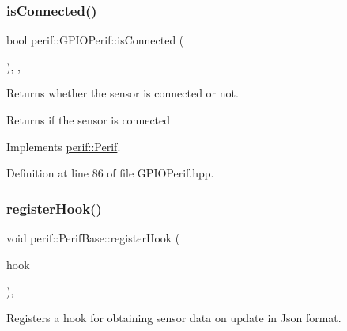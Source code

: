 \subsubsection{\texorpdfstring{isConnected()}{isConnected()}}
{\footnotesize\ttfamily bool perif\+::\+G\+P\+I\+O\+Perif\+::is\+Connected (\begin{DoxyParamCaption}{ }\end{DoxyParamCaption})\hspace{0.3cm}{\ttfamily [inline]}, {\ttfamily [override]}, {\ttfamily [virtual]}}

Returns whether the sensor is connected or not.

\begin{DoxyReturn}{Returns}
if the sensor is connected 
\end{DoxyReturn}


Implements \mbox{\hyperlink{classperif_1_1Perif_ab9a17fad04e595f3ac0c78b9d3be4c9e}{perif\+::\+Perif}}.



Definition at line 86 of file G\+P\+I\+O\+Perif.\+hpp.


\begin{DoxyCode}{0}

\end{DoxyCode}
\mbox{\label{classperif_1_1PerifBase_a2e8bcc221ee253b21b61c7c07307d931}} 
\subsubsection{\texorpdfstring{registerHook()}{registerHook()}}
{\footnotesize\ttfamily void perif\+::\+Perif\+Base\+::register\+Hook (\begin{DoxyParamCaption}\item[{function$<$ void(\mbox{\hyperlink{Perif_8hpp_a358ff4ee6d24694ee7661f0cce14377e}{Dev\+Map}} \&)$>$ \&\&}]{hook }\end{DoxyParamCaption})\hspace{0.3cm}{\ttfamily [inline]}, {\ttfamily [inherited]}}

Registers a hook for obtaining sensor data on update in Json format.


